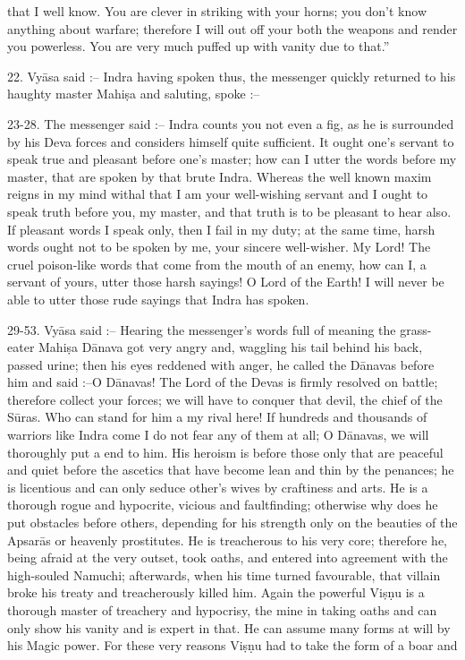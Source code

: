 that I well know. You are clever in striking with your horns; you don't know anything about warfare; therefore I will out off your both the weapons and render you powerless. You are very much puffed up with vanity due to that.''

22. Vy\=asa said :-- Indra having spoken thus, the messenger quickly returned to his haughty master Mahi\d{s}a and saluting, spoke :--

23-28. The messenger said :-- Indra counts you not even a fig, as he is surrounded by his Deva forces and considers himself quite sufficient. It ought one's servant to speak true and pleasant before one's master; how can I utter the words before my master, that are spoken by that brute Indra. Whereas the well known maxim reigns in my mind withal that I am your well-wishing servant and I ought to speak truth before you, my master, and that truth is to be pleasant to hear also. If pleasant words I speak only, then I fail in my duty; at the same time, harsh words ought not to be spoken by me, your sincere well-wisher. My Lord! The cruel poison-like words that come from the mouth of an enemy, how can I, a servant of yours, utter those harsh sayings! O Lord of the Earth! I will never be able to utter those rude sayings that Indra has spoken.

29-53. Vy\=asa said :-- Hearing the messenger's words full of meaning the grass-eater Mahi\d{s}a D\=anava got very angry and, waggling his tail behind his back, passed urine; then his eyes reddened with anger, he called the D\=anavas before him and said :--O D\=anavas! The Lord of the Devas is firmly resolved on battle; therefore collect your forces; we will have to conquer that devil, the chief of the S\=uras. Who can stand for him a my rival here! If hundreds and thousands of warriors like Indra come I do not fear any of them at all; O D\=anavas, we will thoroughly put a end to him. His heroism is before those only that are peaceful and quiet before the ascetics that have become lean and thin by the penances; he is licentious and can only seduce other's wives by craftiness and arts. He is a thorough rogue and hypocrite, vicious and faultfinding; otherwise why does he put obstacles before others, depending for his strength only on the beauties of the Apsar\=as or heavenly prostitutes. He is treacherous to his very core; therefore he, being afraid at the very outset, took oaths, and entered into agreement with the high-souled Namuchi; afterwards, when his time turned favourable, that villain broke his treaty and treacherously killed him. Again the powerful Vi\d{s}\d{n}u is a thorough master of treachery and hypocrisy, the mine in taking oaths and can only show his vanity and is expert in that. He can assume many forms at will by his Magic power. For these very reasons Vi\d{s}\d{n}u had to take the form of a boar and

